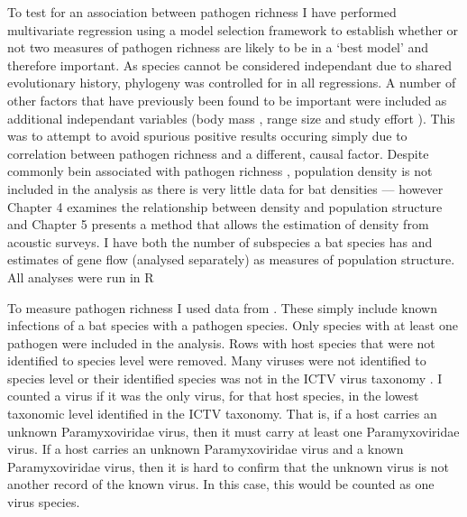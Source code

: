 To test for an association between pathogen richness I have performed multivariate regression using a model selection framework to establish whether or not two measures of pathogen richness are likely to be in a `best model' and therefore important.
As species cannot be considered independant due to shared evolutionary history, phylogeny was controlled for in all regressions.
A number of other factors that have previously been found to be important were included as additional independant variables (body mass \cite{kamiya2014determines, turmelle2009correlates, gay2014parasite, maganga2014bat}, range size \cite{kamiya2014determines, turmelle2009correlates, maganga2014bat} and study effort \cite{turmelle2009correlates, gay2014parasite, maganga2014bat}).
This was to attempt to avoid spurious positive results occuring simply due to correlation between pathogen richness and a different, causal factor.
Despite commonly bein associated with pathogen richness \cite{arneberg2002host, kamiya2014determines, nunn2003comparative}, population density is not included in the analysis as there is very little data for bat densities --- however Chapter 4 examines the relationship between density and population structure and Chapter 5 presents a method that allows the estimation of density from acoustic surveys.
I have both the number of subspecies a bat species has and estimates of gene flow (analysed separately) as measures of population structure.
All analyses were run in R \cite{R}

To measure pathogen richness I used data from \cite{luis2013comparison}. 
These simply include known infections of a bat species with a pathogen species. 
Only species with at least one pathogen were included in the analysis.
Rows with host species that were not identified to species level were removed.
Many viruses were not identified to species level or their identified species was not in the ICTV virus taxonomy \cite{ICTV}.
I counted a virus if it was the only virus, for that host species, in the lowest taxonomic level identified in the ICTV taxonomy.
That is, if a host carries an unknown Paramyxoviridae virus, then it must carry at least one Paramyxoviridae virus.
If a host carries an unknown Paramyxoviridae virus and a known Paramyxoviridae virus, then it is hard to confirm that the unknown virus is not another record of the known virus.
In this case, this would be counted as one virus species.






